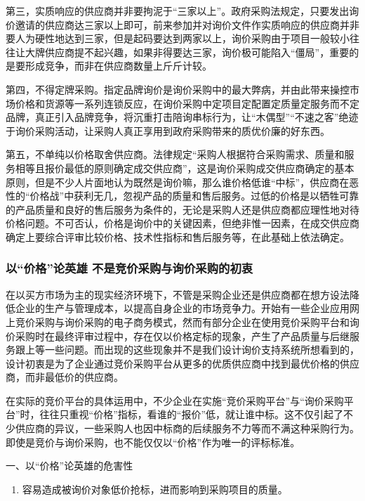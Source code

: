 \begin{enumerate}
    第三，实质响应的供应商并非要拘泥于“三家以上”。政府采购法规定，只要发出询价邀请的供应商达三家以上即可，前来参加并对询价文件作实质响应的供应商并非要人为硬性地达到三家，但是起码要达到两家以上，询价采购由于项目一般较小往往让大牌供应商提不起兴趣，如果非得要达三家，询价极可能陷入“僵局”，重要的是要形成竞争，而非在供应商数量上斤斤计较。

    第四，不得定牌采购。指定品牌询价是询价采购中的最大弊病，并由此带来操控市场价格和货源等一系列连锁反应，在询价采购中定项目定配置定质量定服务而不定品牌，真正引入品牌竞争，将沉重打击陪询串标行为，让“木偶型”“不速之客”绝迹于询价采购活动，让采购人真正享用到政府采购带来的质优价廉的好东西。

    第五，不单纯以价格取舍供应商。法律规定“采购人根据符合采购需求、质量和服务相等且报价最低的原则确定成交供应商”，这是询价采购成交供应商确定的基本原则，但是不少人片面地认为既然是询价嘛，那么谁价格低谁“中标”，供应商在恶性的“价格战”中获利无几，忽视产品的质量和售后服务。过低的价格是以牺牲可靠的产品质量和良好的售后服务为条件的，无论是采购人还是供应商都应理性地对待价格问题。不可否认，价格是询价中的关键因素，但绝非惟一因素，在成交供应商确定上要综合评审比较价格、技术性指标和售后服务等，在此基础上依法确定。

\subsubsection {以“价格”论英雄 不是竞价采购与询价采购的初衷}

    在以买方市场为主的现实经济环境下，不管是采购企业还是供应商都在想方设法降低企业的生产与管理成本，以提高自身企业的市场竞争力。开始有一些企业应用网上竞价采购与询价采购的电子商务模式，然而有部分企业在使用竞价采购平台和询价采购时在最终评审过程中，存在仅以价格定标的现象，产生了产品质量与后继服务跟上等一些问题。而出现的这些现象并不是我们设计询价支持系统所想看到的，设计初衷是为了企业通过竞价采购平台从更多的优质供应商中找到最优价格的供应商，而非最低价的供应商。

      在实际的竞价平台的具体运用中，不少企业在实施“竞价采购平台”与“询价采购平台”时，往往只重视“价格”指标，看谁的“报价”低，就让谁中标。这不仅引起了不少供应商的异议，一些采购人也因中标商的后续服务不力等而不满这种采购行为。即使是竞价与询价采购，也不能仅仅以“价格”作为唯一的评标标准。

      一、以“价格”论英雄的危害性

    \begin{enumerate}
        \item  容易造成被询价对象低价抢标，进而影响到采购项目的质量。


\end{enumerate}
\end{enumerate}
